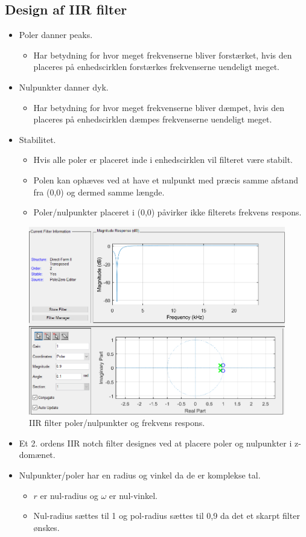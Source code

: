 \documentclass[danish]{article}
\begin{document}
\subsection{Design af IIR filter}
\begin{itemize}
	\item Poler danner peaks.
	\begin{itemize}
		\item Har betydning for hvor meget frekvenserne bliver forstærket, hvis den placeres på enhedscirklen forstærkes frekvenserne uendeligt meget.
	\end{itemize}
	\item Nulpunkter danner dyk.
	\begin{itemize}
		\item Har betydning for hvor meget frekvenserne bliver dæmpet, hvis den placeres på enhedscirklen dæmpes frekvenserne uendeligt meget.
	\end{itemize}
	\item Stabilitet.
	\begin{itemize}
		\item Hvis alle poler er placeret inde i enhedscirklen vil filteret være stabilt.
		\item Polen kan ophæves ved at have et nulpunkt med præcis samme afstand fra (0,0) og dermed samme længde.
		\item Poler/nulpunkter placeret i (0,0) påvirker ikke filterets frekvens respons. 
	\end{itemize}
\end{itemize}

\begin{figure}[H]
	\centering
	\includegraphics[width=0.6\linewidth]{graphics/case2_3}
	\caption{IIR filter poler/nulpunkter og frekvens respons.}
	\label{fig:case2_3}
\end{figure}


\begin{itemize}
	\item Et 2. ordens IIR notch filter designes ved at placere poler og nulpunkter i z-domænet.
	\item Nulpunkter/poler har en radius og vinkel da de er komplekse tal.
	\begin{itemize}
		\item $r$ er nul-radius og $\omega$ er nul-vinkel.
		\item Nul-radius sættes til 1 og pol-radius sættes til 0,9 da det et skarpt filter ønskes.
	\end{itemize}
\end{itemize}
\end{document}
